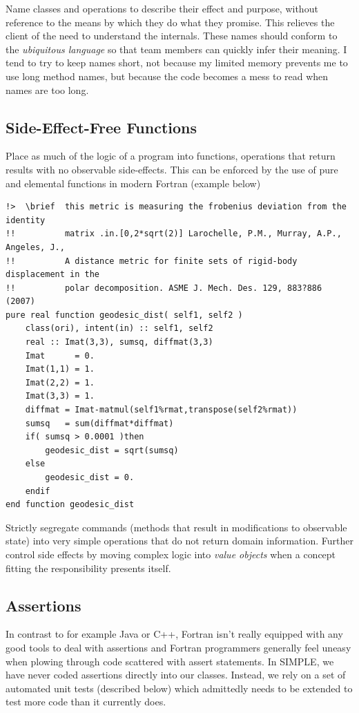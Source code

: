 \documentclass[a4paper,11pt]{article}
\begin{document}
Name classes and operations to describe their effect and purpose, without reference to the means by which they do what they promise. This relieves the client of the need to understand the internals. These names should conform to the \textit{ubiquitous language} so that team members can quickly infer their meaning. I tend to try to keep names short, not because my limited memory prevents me to use long method names, but because the code becomes a mess to read when names are too long.

\subsection{Side-Effect-Free Functions}
Place as much of the logic of a program into functions, operations that return results with no observable side-effects. This can be enforced by the use of pure and elemental functions in modern Fortran (example below)

\begin{verbatim}
!>  \brief  this metric is measuring the frobenius deviation from the identity
!!          matrix .in.[0,2*sqrt(2)] Larochelle, P.M., Murray, A.P., Angeles, J., 
!!          A distance metric for finite sets of rigid-body displacement in the 
!!          polar decomposition. ASME J. Mech. Des. 129, 883?886 (2007)
pure real function geodesic_dist( self1, self2 )
    class(ori), intent(in) :: self1, self2
    real :: Imat(3,3), sumsq, diffmat(3,3)
    Imat      = 0.
    Imat(1,1) = 1.
    Imat(2,2) = 1.
    Imat(3,3) = 1.
    diffmat = Imat-matmul(self1%rmat,transpose(self2%rmat))
    sumsq   = sum(diffmat*diffmat)
    if( sumsq > 0.0001 )then
        geodesic_dist = sqrt(sumsq)
    else
        geodesic_dist = 0.
    endif
end function geodesic_dist
\end{verbatim}

Strictly segregate commands (methods that result in modifications to observable state) into very simple operations that do not return domain information. Further control side effects by moving complex logic into \textit{value objects} when a concept fitting the responsibility presents itself.

\subsection{Assertions}
In contrast to for example Java or C++, Fortran isn't really equipped with any good tools to deal with assertions and Fortran programmers generally feel uneasy when plowing through code scattered with assert statements. In SIMPLE, we have never coded assertions directly into our classes. Instead, we rely on a set of automated unit tests (described below) which admittedly needs to be extended to test more code than it currently does. 
\end{document}
